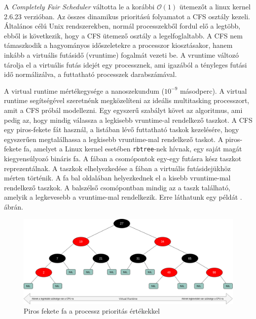 
\label{sec:cfs}

A \textit{Completely Fair Scheduler} váltotta le a korábbi $\mathcal{O}(1)$ ütemezőt a linux kernel 2.6.23 verzióban.
Az összes dinamikus prioritású folyamatot a CFS osztály kezeli. Általános célú Unix rendszerekben, normál processzekből fordul elő a legtöbb, ebből is következik, hogy a CFS ütemező osztály a legelfoglaltabb.
A CFS nem támaszkodik a hagyományos időszeletekre a processzor kiosztásakor, hanem inkább a virtuális futásidő (vruntime) fogalmát vezeti be.
A vruntime változó tárolja el a virtuális futás idejét egy processznek, ami igazából a tényleges futási idő normálizálva, a futtatható processzek darabszámával.

A virtual runtime mértékegysége a nanoszekundum ($10^{-9}$ másodperc).
A virtual runtime segítségével szeretnénk megközelíteni az ideális multitasking processzort, amit a CFS próbál modellezni. Egy egyszerű szabályt követ az algoritmus, ami pedig az, hogy mindig válassza a legkisebb vruntime-al rendelkező taszkot. A CFS egy piros-fekete fát használ, a listában lévő futtatható taskok kezelésére, hogy egyszerűen megtalálhassa a legkisebb vruntime-mal rendelkező taskot.
A piros-fekete fa, amelyet a Linux kernel esetében \texttt{rbtree}-nek hívnak, egy saját magát kiegyensúlyozó bináris fa.
A fában a csomópontok egy-egy futásra kész taszkot reprezentálnak. A taszkok elhelyezkedése a fában a virtuális futásidejükhöz mérten történik. 
A fa bal oldalában helyezkednek el a kisebb vruntime-mal rendelkező taszkok.
A balszélső csomópontban mindig az a taszk található, amelyik a legkevesebb a vruntime-mal rendelkezik. Erre láthatunk egy példát . ábrán.

\begin{figure}[h]
\centering
\includegraphics[width=\textwidth]{images/redBlackTree.png}
\caption{Piros fekete fa a processz prioritás értékekkel}
\label{fig:rb_tree}
\end{figure}


